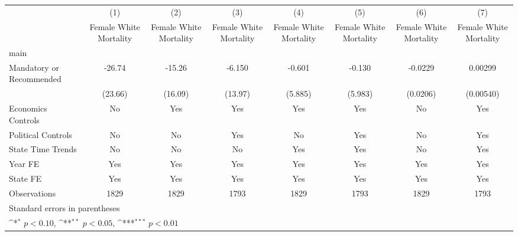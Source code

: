 {
\def\sym#1{\ifmmode^{#1}\else\(^{#1}\)\fi}
\begin{longtable}{l*{7}{c}}
\hline\hline\endfirsthead\hline\endhead\hline\endfoot\endlastfoot
                    &\multicolumn{1}{c}{(1)}&\multicolumn{1}{c}{(2)}&\multicolumn{1}{c}{(3)}&\multicolumn{1}{c}{(4)}&\multicolumn{1}{c}{(5)}&\multicolumn{1}{c}{(6)}&\multicolumn{1}{c}{(7)}\\
                    &\multicolumn{1}{c}{Female White Mortality}&\multicolumn{1}{c}{Female White Mortality}&\multicolumn{1}{c}{Female White Mortality}&\multicolumn{1}{c}{Female White Mortality}&\multicolumn{1}{c}{Female White Mortality}&\multicolumn{1}{c}{Female White Mortality}&\multicolumn{1}{c}{Female White Mortality}\\
\hline
main                &                     &                     &                     &                     &                     &                     &                     \\
Mandatory or Recommended&      -26.74         &      -15.26         &      -6.150         &      -0.601         &      -0.130         &     -0.0229         &     0.00299         \\
                    &     (23.66)         &     (16.09)         &     (13.97)         &     (5.885)         &     (5.983)         &    (0.0206)         &   (0.00540)         \\
[1em]
Economics Controls  &          No         &         Yes         &         Yes         &         Yes         &         Yes         &          No         &         Yes         \\
[1em]
Political Controls  &          No         &          No         &         Yes         &          No         &         Yes         &          No         &         Yes         \\
[1em]
State Time Trends   &          No         &          No         &          No         &         Yes         &         Yes         &          No         &         Yes         \\
[1em]
Year FE             &         Yes         &         Yes         &         Yes         &         Yes         &         Yes         &         Yes         &         Yes         \\
[1em]
State FE            &         Yes         &         Yes         &         Yes         &         Yes         &         Yes         &         Yes         &         Yes         \\
\hline
Observations        &        1829         &        1829         &        1793         &        1829         &        1793         &        1829         &        1793         \\
\hline\hline
\multicolumn{8}{l}{\footnotesize Standard errors in parentheses}\\
\multicolumn{8}{l}{\footnotesize \sym{*} \(p<0.10\), \sym{**} \(p<0.05\), \sym{***} \(p<0.01\)}\\
\end{longtable}
}
